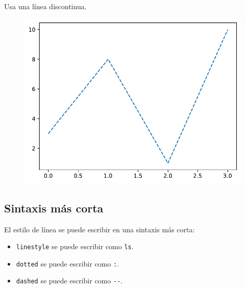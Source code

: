 \begin{code} Usa una línea discontinua.

\begin{Shaded}
\begin{Highlighting}[]
\OperatorTok{=} \NormalTok{)}
\end{Highlighting}
\end{Shaded}

\begin{figure}
  \centering
  \includegraphics[scale=0.6]{img/grafica1017.pdf}
\end{figure}

\end{code}

\subsection{Sintaxis más corta}

El estilo de línea se puede escribir en una sintaxis más corta:

\begin{itemize}
  \item \texttt{linestyle} se puede escribir como \texttt{ls}.
  \item \texttt{dotted} se puede escribir como \texttt{:}.
  \item \texttt{dashed} se puede escribir como \texttt{-\/-}.
\end{itemize}

